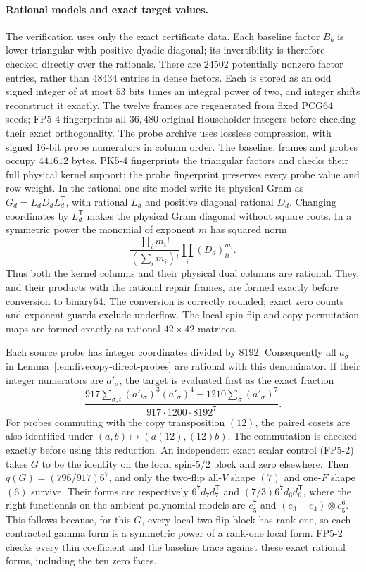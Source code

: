 \paragraph{Rational models and exact target values.}
The verification uses only the exact certificate data. Each baseline factor
$B_b$ is lower triangular with positive dyadic diagonal; its invertibility
is therefore checked directly over the rationals. There are $24502$
potentially nonzero factor entries, rather than $48434$ entries in dense
factors. Each is stored as an odd signed integer of at most $53$ bits times
an integral power of two, and integer shifts reconstruct it exactly.
The twelve frames are regenerated from
fixed PCG64 seeds; FP5-4 fingerprints all $36{,}480$ original Householder
integers before checking their exact orthogonality. The probe archive uses
lossless compression, with signed $16$-bit probe numerators in column order.
The baseline, frames and probes occupy $441612$ bytes. PK5-4 fingerprints
the triangular factors and checks their full physical kernel support;
the probe fingerprint preserves every probe value and row weight.
In the rational
one-site model write its physical Gram as $G_d=L_dD_dL_d^{\mathsf T}$,
with rational $L_d$ and positive diagonal rational $D_d$.
Changing coordinates by $L_d^{\mathsf T}$ makes the physical Gram diagonal
without square roots. In a symmetric power the monomial of exponent $m$
has squared norm
\[
 \frac{\prod_i m_i!}{(\sum_i m_i)!}\prod_i(D_d)_{ii}^{m_i}.
\]
Thus both the kernel columns and their physical dual columns are rational.
They, and their products with the rational repair frames, are formed
exactly before conversion to binary64. The conversion is correctly
rounded; exact zero counts and exponent guards exclude underflow.
The local spin-flip and copy-permutation maps are formed exactly as
rational $42\times42$ matrices.

Each source probe has integer coordinates divided by $8192$. Consequently
all $a_\sigma$ in Lemma~\ref{lem:fivecopy-direct-probes} are rational with
this denominator. If their integer numerators are $a'_{\sigma}$, the target
is evaluated first as the exact fraction
\[
 \frac{917\sum_{\sigma,t}(a'_{t\sigma})^3(a'_\sigma)^4
                  -1210\sum_\sigma(a'_\sigma)^7}
 {917\cdot1200\cdot8192^7}.
\]
For probes commuting with the copy transposition $(12)$, the paired cosets
are also identified under $(a,b)\mapsto(a(12),(12)b)$.
The commutation is checked exactly before using this reduction.
An independent exact scalar control (FP5-2) takes $G$ to be the identity
on the local spin-$5/2$ block and zero elsewhere. Then
$q(G)=(796/917)6^7$, and only the two-flip all-$V$ shape $(7)$ and
one-$F$ shape $(6)$ survive. Their forms are respectively
$6^7d_7d_7^{\mathsf T}$ and $(7/3)6^7d_6d_6^{\mathsf T}$, where the right
functionals on the ambient polynomial models are $e_5^7$ and
$(e_3+e_4)\otimes e_5^6$. This follows because, for this $G$, every
local two-flip block has rank one, so each contracted gamma form is a
symmetric power of a rank-one local form.
FP5-2 checks every thin coefficient and the baseline trace against these
exact rational forms, including the ten zero faces.


